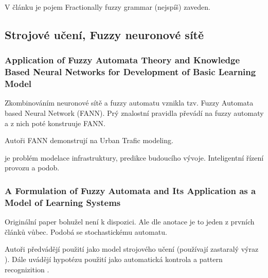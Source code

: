 \documentclass[a4paper,10pt]{article}
\begin{document}
V článku \cite{PalYau-FracFuzzGramAppPatRec} je pojem Fractionally fuzzy grammar (nejspíš) zaveden.


\subsection{Strojové učení, Fuzzy neuronové sítě}

\subsubsection*{Application of Fuzzy Automata Theory and Knowledge Based Neural Networks for Development of Basic Learning Model \cite{DarAhmSin-AppFuzzAutTheKnBsNeuNetDevBasLeaMod}}

Zkombinováním neuronové sítě a fuzzy automatu vznikla tzv. Fuzzy  Automata  based  Neural  Network (FANN). Prý znalostní pravidla převádí na fuzzy automaty a z nich poté konstruuje FANN.

\begin{definition}
\end{definition}


Autoři FANN demonstrují na Urban Trafic modeling.

\begin{definition}
 je problém modelace infrastruktury, predikce budoucího vývoje. Inteligentní řízení provozu a podob.
\end{definition}

\subsubsection*{A Formulation of Fuzzy Automata and Its Application as a Model of Learning Systems \cite{WeeFu-FormFuzzzAutItsAppModLearSyss}}

Originální paper bohužel není k dispozici. Ale dle anotace je to jeden z prvních článků vůbec. Podobá se stochastickému automatu.

\begin{definition}
\end{definition}

Autoři předvádějí použití  jako model strojového učení (používají zastaralý výraz ). Dále uvádějí hypotézu použití jako automatická kontrola a pattern recognizition .
\end{document}
